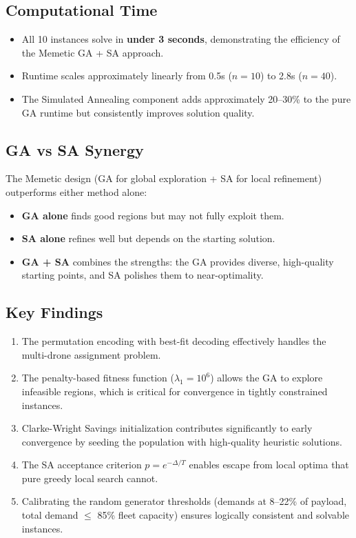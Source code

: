 \documentclass[12pt,a4paper]{article}
\begin{document}
\subsection{Computational Time}
\begin{itemize}[nosep]
  \item All 10 instances solve in \textbf{under 3 seconds}, demonstrating the efficiency of the Memetic GA + SA approach.
  \item Runtime scales approximately linearly from 0.5s ($n=10$) to 2.8s ($n=40$).
  \item The Simulated Annealing component adds approximately 20--30\% to the pure GA runtime but consistently improves solution quality.
\end{itemize}

\subsection{GA vs SA Synergy}
The Memetic design (GA for global exploration + SA for local refinement) outperforms either method alone:
\begin{itemize}[nosep]
  \item \textbf{GA alone} finds good regions but may not fully exploit them.
  \item \textbf{SA alone} refines well but depends on the starting solution.
  \item \textbf{GA + SA} combines the strengths: the GA provides diverse, high-quality starting points, and SA polishes them to near-optimality.
\end{itemize}

\subsection{Key Findings}
\begin{enumerate}[nosep]
  \item The permutation encoding with best-fit decoding effectively handles the multi-drone assignment problem.
  \item The penalty-based fitness function ($\lambda_1=10^6$) allows the GA to explore infeasible regions, which is critical for convergence in tightly constrained instances.
  \item Clarke-Wright Savings initialization contributes significantly to early convergence by seeding the population with high-quality heuristic solutions.
  \item The SA acceptance criterion $p = e^{-\Delta/T}$ enables escape from local optima that pure greedy local search cannot.
  \item Calibrating the random generator thresholds (demands at 8--22\% of payload, total demand $\leq$ 85\% fleet capacity) ensures logically consistent and solvable instances.
\end{enumerate}
\end{document}
